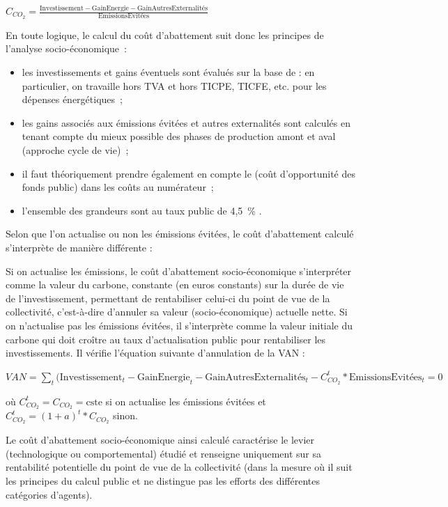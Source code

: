 \documentclass[10.5pt,a4paper]{article}
\begin{document}
{{{$C_{CO_2} = \frac{\textrm{Investissement} - \textrm{GainEnergie} - \textrm{GainAutresExternalités}}{\textrm{EmissionsEvitées}} $

En toute logique, le calcul du coût d'abattement suit donc les principes de l'analyse socio-économique : 
\begin{itemize}
	\item les investissements et gains éventuels sont évalués sur la base de  : en particulier, on travaille hors TVA et hors TICPE, TICFE, etc. pour les dépenses énergétiques ;
	\item les gains associés aux émissions évitées et autres externalités sont calculés en tenant compte du mieux possible des phases de production amont et aval (approche cycle de vie) ; 
	\item il faut théoriquement prendre également en compte le  (coût d’opportunité des fonds public) dans les coûts au numérateur ;
	\item l’ensemble des grandeurs sont  au taux public de 4,5~\% \citep{Quinet2013}. 
\end{itemize}

Selon que l'on actualise ou non les émissions évitées, le coût d'abattement calculé s’interprète de manière différente :

Si on actualise les émissions, le coût d’abattement socio-économique  s’interpréter comme la valeur du carbone, constante (en euros constants) sur la durée de vie de l’investissement, permettant de rentabiliser celui-ci du point de vue de la collectivité, c'est-à-dire d’annuler sa valeur (socio-économique) actuelle nette. Si on n'actualise pas les émissions évitées, il s’interprète comme la valeur initiale du carbone qui doit croître au taux d'actualisation public pour rentabiliser les investissements. 
Il vérifie l’équation suivante d’annulation de la VAN  :

$VAN = \sum_t(\textrm{Investissement}_t - \textrm{GainEnergie}_t - \textrm{GainAutresExternalités}_t - C_{CO_2}^t*\textrm{EmissionsEvitées}_t = 0$

où $C_{CO_2}^t = C_{CO_2} = \textrm{cste}$ si on actualise les émissions évitées et $C_{CO_2}^t = (1+a)^t*C_{CO_2}$ sinon. 

Le coût d'abattement socio-économique ainsi calculé caractérise le levier (technologique ou comportemental) étudié et renseigne uniquement sur sa rentabilité potentielle du point de vue de la collectivité (dans la mesure où il suit les principes du calcul public et ne distingue pas les efforts des différentes catégories d'agents).

}}}
\end{document}
